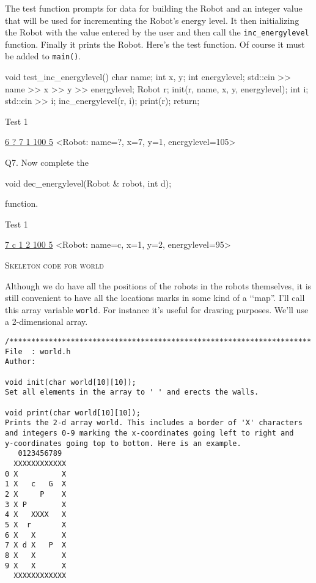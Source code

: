 The test function prompts for data for building the Robot
and an integer value that will be used for incrementing the Robot's energy
level.
It then initializing the Robot with the value entered by the
user and then call the \verb!inc_energylevel! function.
Finally it prints the Robot.
Here's the test function.
Of course it must be added to \verb!main()!.
{\small
\begin{console}[commandchars=\~\!\@]
void test_inc_energylevel()
{
    char name;
    int x, y;
    int energylevel;
    std::cin >> name >> x >> y >> energylevel;
    Robot r;
    init(r, name, x, y, energylevel);
    int i;
    std::cin >> i;
    inc_energylevel(r, i); 
    print(r);
    return;
}
\end{console}


Test 1
\begin{console}[commandchars=\\\{\}]
\underline{6 ? 7 1 100 5}
<Robot: name=?, x=7, y=1, energylevel=105>
\end{console}

\newpage
Q7.
Now complete the
\begin{console}[commandchars=\\\{\}]
void dec_energylevel(Robot & robot, int d);
\end{console}
function.

Test 1
\begin{console}[commandchars=\\\{\}]
\underline{7 c 1 2 100 5}
<Robot: name=c, x=1, y=2, energylevel=95>
\end{console}



\newpage
\textsc{Skeleton code for world}

Although we do have all the positions of the robots in the robots themselves,
it is still convenient to have all the locations marks in some kind of a 
\lq\lq map''.
I'll call this array variable \verb!world!.
For instance it's useful for drawing purposes.
We'll use a 2-dimensional array.

{\small
\begin{Verbatim}[frame=single]
/*********************************************************************
File  : world.h
Author: 

void init(char world[10][10]);
Set all elements in the array to ' ' and erects the walls.

void print(char world[10][10]);
Prints the 2-d array world. This includes a border of 'X' characters
and integers 0-9 marking the x-coordinates going left to right and 
y-coordinates going top to bottom. Here is an example.
   0123456789
  XXXXXXXXXXXX
0 X          X
1 X   c   G  X
2 X     P    X
3 X P        X
4 X   XXXX   X
5 X  r       X
6 X   X      X
7 X d X   P  X
8 X   X      X
9 X   X      X
  XXXXXXXXXXXX


\end{Verbatim}}}
